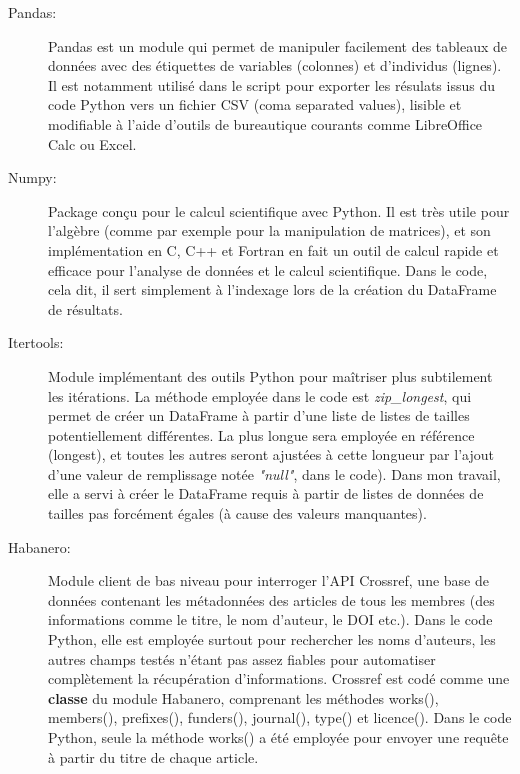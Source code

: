 \documentclass{book}
\begin{document}
\begin{description}
    \item[Pandas:] Pandas est un module qui permet de manipuler facilement des
        tableaux de données avec des étiquettes de variables (colonnes) et d'individus
        (lignes). Il est notamment utilisé dans le script pour exporter les résulats
        issus du code Python vers un fichier CSV (coma separated values), lisible et
        modifiable à l'aide d'outils de bureautique courants comme LibreOffice Calc ou
        Excel.

    \item[Numpy:] Package conçu pour le calcul scientifique avec Python. Il est
        très utile pour l'algèbre (comme par exemple pour la manipulation de matrices),
        et son implémentation en C, C++ et Fortran en fait un outil de calcul rapide et
        efficace pour l'analyse de données et le calcul scientifique. Dans le code,
        cela dit, il sert simplement à l'indexage lors de la création du DataFrame de
        résultats.

    \item[Itertools:] Module implémentant des outils Python pour maîtriser plus
        subtilement les itérations. La méthode employée dans le code est
        \textit{zip\_longest}, qui permet de créer un DataFrame à partir d'une liste de
        listes de tailles potentiellement différentes. La plus longue sera employée en
        référence (longest), et toutes les autres seront ajustées à cette longueur par
        l'ajout d'une valeur de remplissage notée \textit{"null"}, dans le code). Dans mon travail, elle a servi à créer le DataFrame requis à partir de listes de données de tailles pas forcément égales (à cause des valeurs manquantes).

    \item[Habanero:] Module client de bas niveau pour interroger l'API
        Crossref, une base de données contenant les métadonnées des articles de tous les
        membres (des informations comme le titre, le nom d'auteur, le DOI etc.). Dans
        le code Python, elle est employée surtout pour rechercher les noms d'auteurs,
        les autres champs testés n'étant pas assez fiables pour automatiser
        complètement la récupération d'informations. Crossref est codé comme une
        \textbf{classe} du module Habanero, comprenant les méthodes works(), members(),
        prefixes(), funders(), journal(), type() et licence(). Dans le code Python,
        seule la méthode works() a été employée pour envoyer une requête à partir du
        titre de chaque article.


\end{description}
\end{document}
